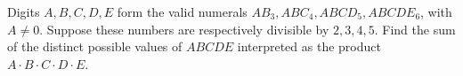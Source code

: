 Digits $A,B,C,D,E$ form the valid numerals $AB_3,ABC_4,ABCD_5,ABCDE_6$, with $A\ne0$. Suppose these numbers are respectively divisible by $2,3,4,5$. Find the sum of the distinct possible values of $ABCDE$ interpreted as the product $A\cdot B\cdot C\cdot D\cdot E$.
